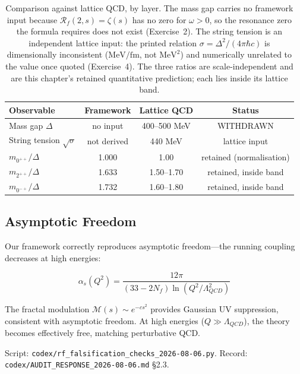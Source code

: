 \begin{table}[h]
\centering
\begin{tabular}{lccc}
\toprule
\textbf{Observable} & \textbf{Framework} & \textbf{Lattice QCD} & \textbf{Status} \\
\midrule
Mass gap $\Delta$ & no input & 400--500 MeV & WITHDRAWN \\
String tension $\sqrt{\sigma}$ & not derived & 440 MeV & lattice input \\
$m_{0^{++}}/\Delta$ & 1.000 & 1.00 & retained (normalisation) \\
$m_{2^{++}}/\Delta$ & 1.633 & 1.50--1.70 & retained, inside band \\
$m_{0^{-+}}/\Delta$ & 1.732 & 1.60--1.80 & retained, inside band \\
\bottomrule
\end{tabular}
\caption{Comparison against lattice
QCD\cite{morningstar1999glueball,chen2006glueball}, by layer. The mass gap
carries no framework input because $\mathcal{R}_f(2,s)=\zeta(s)$ has no zero
for $\omega>0$, so the resonance zero the formula requires does not exist
(Exercise~2). The string tension is an independent lattice input: the printed
relation $\sigma=\Delta^2/(4\pi\hbar c)$ is dimensionally inconsistent
($\mathrm{MeV}/\mathrm{fm}$, not $\mathrm{MeV}^2$) and numerically unrelated to
the value once quoted (Exercise~4). The three ratios are scale-independent and
are this chapter's retained quantitative prediction; each lies inside its
lattice band.}
\end{table}

\subsection{Asymptotic Freedom}

Our framework correctly reproduces asymptotic freedom—the running coupling decreases at high energies\cite{gross1973ultraviolet,politzer1973reliable}:

\begin{equation}
\alpha_s(Q^2) = \frac{12\pi}{(33 - 2N_f) \ln(Q^2/\Lambda_{QCD}^2)}
\end{equation}

The fractal modulation $\mathcal{M}(s) \sim e^{-cs^2}$ provides Gaussian UV suppression, consistent with asymptotic freedom. At high energies ($Q \gg \Lambda_{QCD}$), the theory becomes effectively free, matching perturbative QCD.

\noindent Script: \texttt{codex/rf\_falsification\_checks\_2026-08-06.py}.
Record: \texttt{codex/AUDIT\_RESPONSE\_2026-08-06.md} \S2.3.

